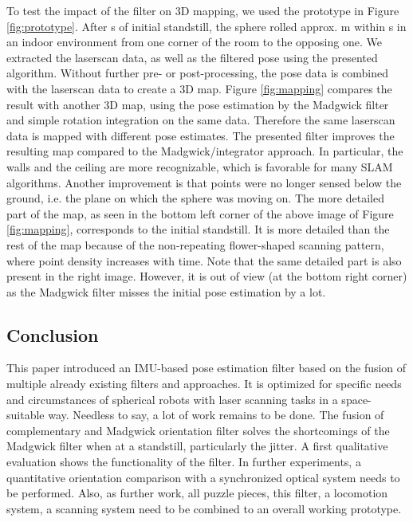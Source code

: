 \documentclass[letterpaper, 10 pt, conference]{ieeeconf}  %
\begin{document}
To test the impact of the filter on 3D mapping, we used the prototype in Figure \ref{fig:prototype}.
After \unit[2]{s} of initial standstill, the sphere rolled approx. \unit[4]{m} within \unit[5]{s} in an indoor environment from one corner of the room to the opposing one.
We extracted the laserscan data, as well as the filtered pose using the presented algorithm.
Without further pre- or post-processing, the pose data is combined with the laserscan data to create a 3D map.
Figure \ref{fig:mapping} compares the result with another 3D map, using the pose estimation by the Madgwick filter and simple rotation integration on the same data.
Therefore the same laserscan data is mapped with different pose estimates.
The presented filter improves the resulting map compared to the Madgwick/integrator approach.
In particular, the walls and the ceiling are more recognizable, which is favorable for many SLAM algorithms.
Another improvement is that points were no longer sensed below the ground, i.e. the plane on which the sphere was moving on.
The more detailed part of the map, as seen in the bottom left corner of the above image of Figure \ref{fig:mapping}, corresponds to the initial standstill.
It is more detailed than the rest of the map because of the non-repeating flower-shaped scanning pattern, where point density increases with time.
Note that the same detailed part is also present in the right image.
However, it is out of view (at the bottom right corner) as the Madgwick filter misses the initial pose estimation by a lot. 


\subsection{Conclusion}
This paper introduced an IMU-based pose estimation filter based on the fusion of multiple already existing filters and approaches.
It is optimized for specific needs and circumstances of spherical robots with laser scanning tasks in a space-suitable way.
Needless to say, a lot of work remains to be done.
The fusion of complementary and Madgwick orientation filter solves the shortcomings of the Madgwick filter when at a standstill, particularly the jitter.
A first qualitative evaluation shows the functionality of the filter.
In further experiments, a quantitative orientation comparison with a synchronized optical system needs to be performed.
Also, as further work, all puzzle pieces, this filter, a locomotion system, a scanning system need to be combined to an overall working prototype.
\end{document}
